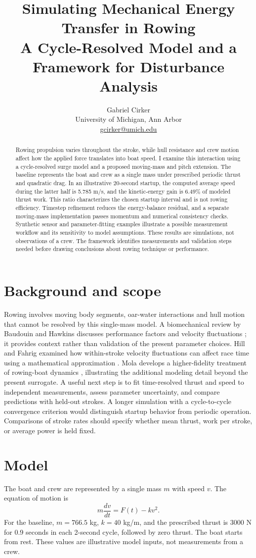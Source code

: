 \documentclass[11pt]{article}
\title{Simulating Mechanical Energy Transfer in Rowing\\\large A Cycle-Resolved Model and a Framework for Disturbance Analysis}
\author{Gabriel Cirker\\\small University of Michigan, Ann Arbor\\\small \href{mailto:gcirker@umich.edu}{gcirker@umich.edu}}
\date{}
\begin{document}
\maketitle
\begin{abstract}
Rowing propulsion varies throughout the stroke, while hull resistance and crew motion affect how the applied force translates into boat speed. I examine this interaction using a cycle-resolved surge model and a proposed moving-mass and pitch extension. The baseline represents the boat and crew as a single mass under prescribed periodic thrust and quadratic drag. In an illustrative 20-second startup, the computed average speed during the latter half is 5.785 m/s, and the kinetic-energy gain is 6.49\% of modeled thrust work. This ratio characterizes the chosen startup interval and is not rowing efficiency. Timestep refinement reduces the energy-balance residual, and a separate moving-mass implementation passes momentum and numerical consistency checks. Synthetic sensor and parameter-fitting examples illustrate a possible measurement workflow and its sensitivity to model assumptions. These results are simulations, not observations of a crew. The framework identifies measurements and validation steps needed before drawing conclusions about rowing technique or performance.
\end{abstract}
\section{Background and scope}
Rowing involves moving body segments, oar-water interactions and hull motion that cannot be resolved by this single-mass model. A biomechanical review by Baudouin and Hawkins discusses performance factors and velocity fluctuations \cite{baudouin}; it provides context rather than validation of the present parameter choices. Hill and Fahrig examined how within-stroke velocity fluctuations can affect race time using a mathematical approximation \cite{hill}. Mola develops a higher-fidelity treatment of rowing-boat dynamics \cite{mola}, illustrating the additional modeling detail beyond the present surrogate. A useful next step is to fit time-resolved thrust and speed to independent measurements, assess parameter uncertainty, and compare predictions with held-out strokes. A longer simulation with a cycle-to-cycle convergence criterion would distinguish startup behavior from periodic operation. Comparisons of stroke rates should specify whether mean thrust, work per stroke, or average power is held fixed.
\section{Model}
The boat and crew are represented by a single mass $m$ with speed $v$. The equation of motion is
\begin{equation}m\frac{dv}{dt}=F(t)-kv^2.\end{equation}
For the baseline, $m=766.5$ kg, $k=40$ kg/m, and the prescribed thrust is 3000 N for 0.9 seconds in each 2-second cycle, followed by zero thrust. The boat starts from rest. These values are illustrative model inputs, not measurements from a crew.
\end{document}
